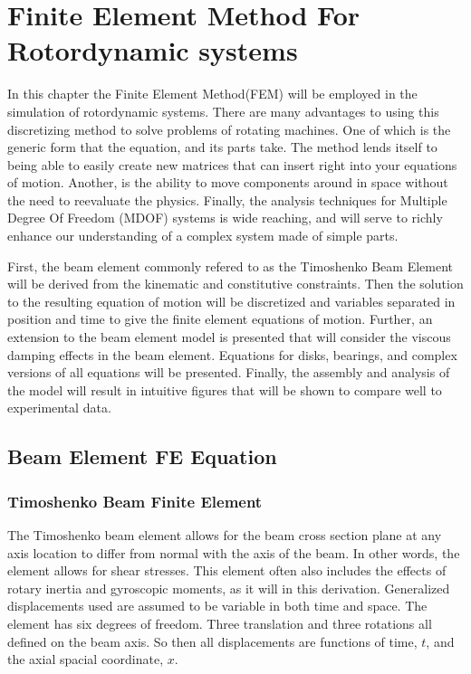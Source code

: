 \chapter{Finite Element Method For Rotordynamic systems}
In this chapter the Finite Element Method(FEM) will be employed in the simulation of rotordynamic systems. There are many advantages to using this discretizing method to solve problems of rotating machines. One of which is the generic form that the equation, and its parts take. The method lends itself to being able to easily create new matrices that can insert right into your equations of motion. Another, is the ability to move components around in space without the need to reevaluate the physics. Finally, the analysis techniques for Multiple Degree Of Freedom (MDOF) systems is wide reaching, and will serve to richly enhance our understanding of a complex system made of simple parts.\par 
First, the beam element commonly refered to as the Timoshenko Beam Element will be derived from the kinematic and constitutive constraints. Then the solution to the resulting equation of motion will be discretized and variables separated in position and time to give the finite element equations of motion. Further, an extension to the beam element model is presented that will consider the viscous damping effects in the beam element. Equations for disks, bearings, and complex versions of all equations will be presented. Finally, the assembly and analysis of the model will result in intuitive figures that will be shown to compare well to experimental data.
\section{Beam Element FE Equation} \label{Beam Element FE Equation}
\subsection{Timoshenko Beam Finite Element} \label{Timoshenko Beam Finite Element}
The Timoshenko beam element allows for the beam cross section plane at any axis location to differ from normal with the axis of the beam. In other words, the element allows for shear stresses. This element often also includes the effects of rotary inertia and gyroscopic moments, as it will in this derivation. Generalized displacements used are assumed to be variable in both time and space. The element has six degrees of freedom. Three translation and three rotations all defined on the beam axis. So then all displacements are functions of time, $ t $, and the axial spacial coordinate, $ x $.
